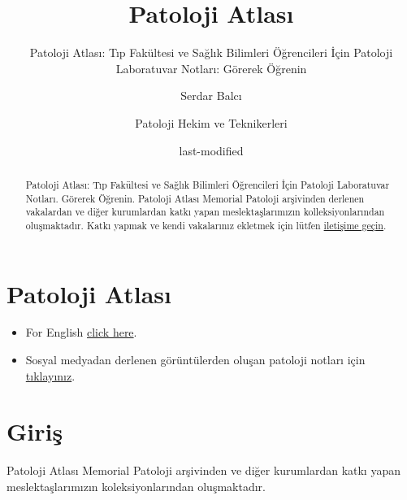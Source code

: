 \documentclass[
  letterpaper,
  DIV=11,
  numbers=noendperiod]{scrreprt}
\title{Patoloji Atlası}
\subtitle{Patoloji Atlası: Tıp Fakültesi ve Sağlık Bilimleri Öğrencileri
İçin Patoloji Laboratuvar Notları: Görerek Öğrenin}
\author{Serdar Balcı \and Patoloji Hekim ve Teknikerleri}
\date{last-modified}
\renewcommand*\contentsname{Içindekiler}
\newcommand\contentsname{Içindekiler}
\begin{document}
\maketitle
\begin{abstract}
Patoloji Atlası: Tıp Fakültesi ve Sağlık Bilimleri Öğrencileri İçin
Patoloji Laboratuvar Notları. Görerek Öğrenin. Patoloji Atlası Memorial
Patoloji arşivinden derlenen vakalardan ve diğer kurumlardan katkı yapan
meslektaşlarımızın kolleksiyonlarından oluşmaktadır. Katkı yapmak ve
kendi vakalarınız ekletmek için lütfen
\href{https://www.patolojiatlasi.com/katki.html}{iletişime geçin}.
\end{abstract}
\ifdefined\Shaded\renewenvironment{Shaded}{\begin{tcolorbox}[sharp corners, boxrule=0pt, borderline west={3pt}{0pt}{shadecolor}, interior hidden, breakable, frame hidden, enhanced]}{\end{tcolorbox}}\fi

\renewcommand*\contentsname{İçindekiler}
{
\hypersetup{linkcolor=}
\setcounter{tocdepth}{1}
\tableofcontents
}

\hypertarget{sec-patoloji-atlasi}{%
\chapter*{Patoloji Atlası}\label{sec-patoloji-atlasi}}


\begin{itemize}
\item
  For English \href{https://www.histopathologyatlas.com/}{click here}.
\item
  Sosyal medyadan derlenen görüntülerden oluşan patoloji notları için
  \href{https://www.patolojinotlari.com/}{tıklayınız}.\\
\end{itemize}


\hypertarget{sec-giris}{%
\chapter*{Giriş}\label{sec-giris}}


Patoloji Atlası Memorial Patoloji arşivinden ve diğer kurumlardan katkı
yapan meslektaşlarımızın koleksiyonlarından oluşmaktadır.
\end{document}
